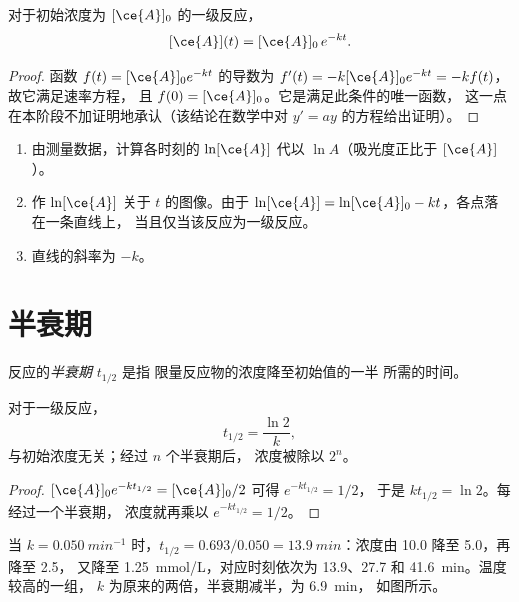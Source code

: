 \begin{proposition}[指数衰减]\label{prop:g12:reaction-rates:exponential}
对于初始浓度为 $[\ce{A}]_0$ 的一级反应，
\[
  [\ce{A}](t) = [\ce{A}]_0\, e^{-kt} .
\]
\end{proposition}

\begin{proof}
函数 $f(t) = [\ce{A}]_0 e^{-kt}$ 的导数为
$f'(t) = -k [\ce{A}]_0 e^{-kt} = -k f(t)$，故它满足速率方程，
且 $f(0) = [\ce{A}]_0$。它是满足此条件的唯一函数，
这一点在本阶段不加证明地承认（该结论在数学中对 $y' = ay$ 的方程给出证明）。
\end{proof}

\begin{method}[检验是否为一级反应]\label{met:g12:reaction-rates:test}
\begin{enumerate}
  \item 由测量数据，计算各时刻的 $\ln [\ce{A}]$
        代以 $\ln A$（吸光度正比于 $[\ce{A}]$）。
  \item 作 $\ln[\ce{A}]$ 关于 $t$ 的图像。由于
        $\ln[\ce{A}] = \ln[\ce{A}]_0 - kt$，各点落在一条直线上，
        当且仅当该反应为一级反应。
  \item 直线的斜率为 $-k$。
\end{enumerate}
\end{method}

\section{半衰期}

\begin{definition}[半衰期]\label{def:g12:reaction-rates:half-life}
反应的\emph{半衰期} $t_{1/2}$ 是指
限量反应物的浓度降至初始值的一半
所需的时间。
\end{definition}

\begin{proposition}[一级反应的半衰期]\label{prop:g12:reaction-rates:half-life}
对于一级反应，
\[
  t_{1/2} = \frac{\ln 2}{k},
\]
与初始浓度无关；经过 $n$ 个半衰期后，
浓度被除以 $2^n$。
\end{proposition}

\begin{proof}
$[\ce{A}]_0 e^{-k t_{1/2}} = [\ce{A}]_0 / 2$ 可得 $e^{-k t_{1/2}} = 1/2$，
于是 $k t_{1/2} = \ln 2$。每经过一个半衰期，
浓度就再乘以 $e^{-k t_{1/2}} = 1/2$。
\end{proof}


\begin{example}[读取半衰期]\label{ex:g12:reaction-rates:half-lives}
当 $k = \qty{0.050}{min^{-1}}$ 时，$t_{1/2} = 0.693 / 0.050 =
\qty{13.9}{min}$：浓度由 10.0 降至 5.0，再降至 2.5，
又降至 \qty{1.25}{mmol/L}，对应时刻依次为 13.9、27.7 和 \qty{41.6}{min}。温度较高的一组，
$k$ 为原来的两倍，半衰期减半，为 \qty{6.9}{min}，
如图所示。
\end{example}

